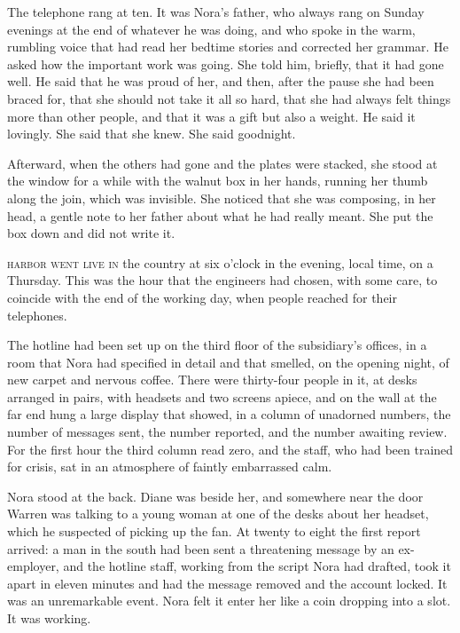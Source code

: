 The telephone rang at ten. It was Nora's father, who always rang on Sunday evenings at the end of whatever he was doing, and who spoke in the warm, rumbling voice that had read her bedtime stories and corrected her grammar. He asked how the important work was going. She told him, briefly, that it had gone well. He said that he was proud of her, and then, after the pause she had been braced for, that she should not take it all so hard, that she had always felt things more than other people, and that it was a gift but also a weight. He said it lovingly. She said that she knew. She said goodnight.

Afterward, when the others had gone and the plates were stacked, she stood at the window for a while with the walnut box in her hands, running her thumb along the join, which was invisible. She noticed that she was composing, in her head, a gentle note to her father about what he had really meant. She put the box down and did not write it.


\textsc{harbor went live in} the country at six o'clock in the evening, local time, on a Thursday. This was the hour that the engineers had chosen, with some care, to coincide with the end of the working day, when people reached for their telephones.

The hotline had been set up on the third floor of the subsidiary's offices, in a room that Nora had specified in detail and that smelled, on the opening night, of new carpet and nervous coffee. There were thirty-four people in it, at desks arranged in pairs, with headsets and two screens apiece, and on the wall at the far end hung a large display that showed, in a column of unadorned numbers, the number of messages sent, the number reported, and the number awaiting review. For the first hour the third column read zero, and the staff, who had been trained for crisis, sat in an atmosphere of faintly embarrassed calm.

Nora stood at the back. Diane was beside her, and somewhere near the door Warren was talking to a young woman at one of the desks about her headset, which he suspected of picking up the fan. At twenty to eight the first report arrived: a man in the south had been sent a threatening message by an ex-employer, and the hotline staff, working from the script Nora had drafted, took it apart in eleven minutes and had the message removed and the account locked. It was an unremarkable event. Nora felt it enter her like a coin dropping into a slot. It was working.

